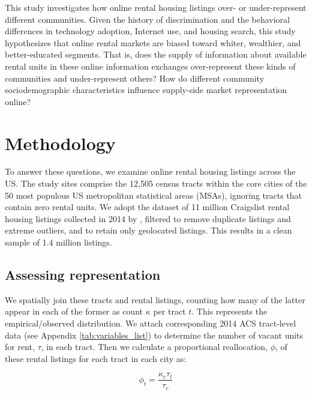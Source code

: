 \documentclass[11pt,onecolumn]{article} %
\begin{document}
This study investigates how online rental housing listings over- or under-represent different communities. Given the history of discrimination and the behavioral differences in technology adoption, Internet use, and housing search, this study hypothesizes that online rental markets are biased toward whiter, wealthier, and better-educated segments. That is, does the supply of information about available rental units in these online information exchanges over-represent these kinds of communities and under-represent others? How do different community sociodemographic characteristics influence supply-side market representation online?




\section{Methodology}

To answer these questions, we examine online rental housing listings across the US. The study sites comprise the 12,505 census tracts within the core cities of the 50 most populous US metropolitan statistical areas (MSAs), ignoring tracts that contain zero rental units. We adopt the dataset of 11 million Craigslist rental housing listings collected in 2014 by \citet{boeing_new_2017}, filtered to remove duplicate listings and extreme outliers, and to retain only geolocated listings. This results in a clean sample of 1.4 million listings.





\subsection{Assessing representation}

We spatially join these tracts and rental listings, counting how many of the latter appear in each of the former as count $\kappa$ per tract $t$. This represents the empirical/observed distribution. We attach corresponding 2014 ACS tract-level data (see Appendix \ref{tab:variables_list}) to determine the number of vacant units for rent, $\tau$, in each tract. Then we calculate a proportional reallocation, $\phi$, of these rental listings for each tract in each city as:

\begin{equation}
	\label{eq:allocation}
	\phi_t = \frac{\kappa_c \tau_t}{\tau_c}
\end{equation}
\end{document}

